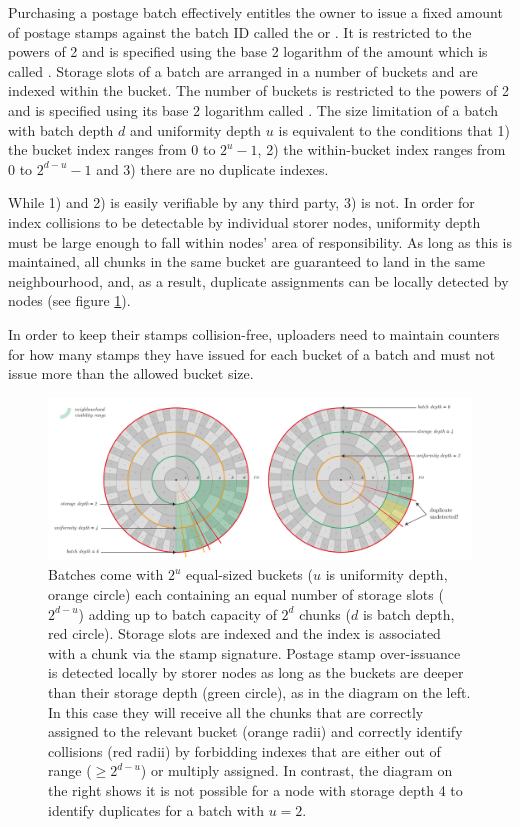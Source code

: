 Purchasing a postage batch effectively entitles the owner to issue a fixed amount of postage stamps against the batch ID called the  or . It is restricted to the powers of 2 and is specified using the base 2 logarithm of the amount which is called . Storage slots of a batch are arranged in a number of buckets and are indexed within the bucket. The number of buckets is restricted to the powers of 2 and is specified using its base 2 logarithm called . The size limitation of a batch with batch depth $d$ and uniformity depth $u$ is equivalent to the conditions that 1) the bucket index ranges from 0 to $2^u-1$, 2) the within-bucket index ranges  from 0 to $2^{d-u}-1$ and 3) there are no duplicate indexes.  

While 1) and 2) is easily verifiable by any third party, 3) is not.
In order for index collisions to be detectable by individual storer nodes, uniformity depth must be large enough to fall within nodes' area of responsibility.
As long as this is maintained, all chunks in the same bucket are guaranteed to land in the same neighbourhood, and, as a result, duplicate assignments can be locally detected by nodes (see figure \ref{fig:over-issuance}).

In order to keep their stamps collision-free, uploaders need to maintain counters for how many stamps they have issued for each bucket of a batch and must not issue more than the allowed bucket size. 

\begin{figure}[!ht]
  \centering
    \includegraphics[width=1\textwidth]{fig/batch-structure.pdf}
  \caption[Batch structure, uniformity and over-issuance]{Batches come with $2^u$ equal-sized buckets ($u$ is uniformity depth, orange circle) each containing an equal number of storage slots ($2^{d-u}$) adding up to batch capacity of $2^d$ chunks ($d$ is batch depth, red circle). Storage slots are indexed and the index is associated with a chunk via the stamp signature. Postage stamp over-issuance is detected locally by storer nodes as long as the buckets are deeper than their storage depth (green circle), as in the diagram on the left. In this case they will receive all the chunks that are correctly assigned to the relevant bucket (orange radii) and correctly identify collisions (red radii) by forbidding indexes that are either out of range ($\geq 2^{d-u}$) or multiply assigned. In contrast, the diagram on the right shows it is not possible for a node with storage depth 4 to identify duplicates for a batch with $u=2$.}
\label{fig:over-issuance}
\end{figure}    



